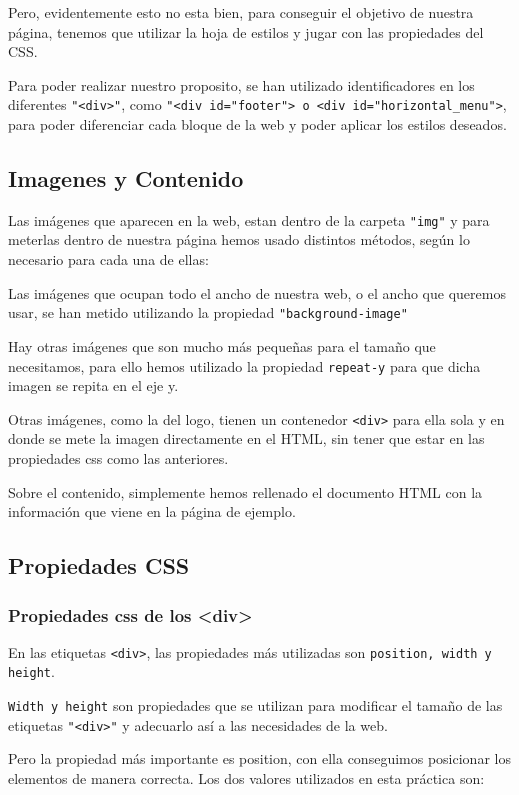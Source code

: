 \documentclass[10pt,a4paper]{article}
\begin{document}
Pero, evidentemente esto no esta bien, para conseguir el objetivo de nuestra página, tenemos que utilizar la hoja de estilos y jugar con las propiedades del CSS.

Para poder realizar nuestro proposito, se han utilizado identificadores en los diferentes \texttt{"<div>"}, como \texttt{"<div id="footer"> o <div id="horizontal\_menu">}, para poder diferenciar cada bloque de la web y poder aplicar los estilos deseados.


\subsection{Imagenes y Contenido}

Las imágenes que aparecen en la web, estan dentro de la carpeta \texttt{"img"} y para meterlas dentro de nuestra página hemos usado distintos métodos, según lo necesario para cada una de ellas:

Las imágenes que ocupan todo el ancho de nuestra web, o el ancho que queremos usar, se han metido utilizando la propiedad \texttt{"background-image"}

Hay otras imágenes que son mucho más pequeñas para el tamaño que necesitamos, para ello hemos utilizado la propiedad \texttt{repeat-y} para que dicha imagen se repita en el eje y.

Otras imágenes, como la del logo, tienen un contenedor \texttt{<div>} para ella sola y en donde se mete la imagen directamente en el HTML, sin tener que estar en las propiedades css como las anteriores. 

Sobre el contenido, simplemente hemos rellenado el documento HTML con la información que viene en la página de ejemplo. 

\subsection{Propiedades CSS}

\subsubsection{Propiedades css de los <div>}
En las etiquetas \texttt{<div>}, las propiedades más utilizadas son \texttt{position, width y height}.

\texttt{Width y height} son propiedades que se utilizan para modificar el tamaño de las etiquetas \texttt{"<div>"} y adecuarlo así a las necesidades de la web.

Pero la propiedad más importante es position, con ella conseguimos posicionar los elementos de manera correcta. Los dos valores utilizados en esta práctica son:
\end{document}
